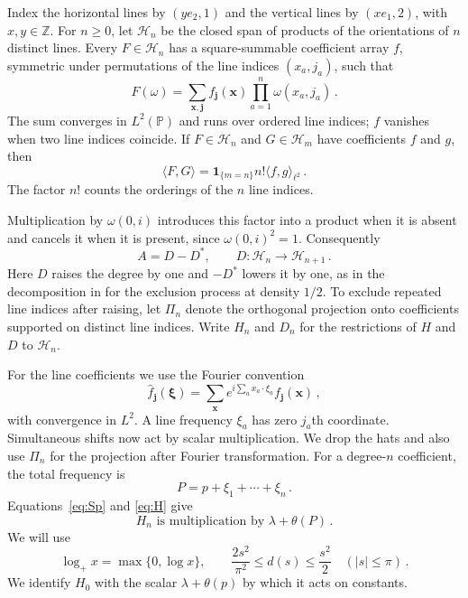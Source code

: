\documentclass[11pt]{amsart}
\theoremstyle{plain}
\theoremstyle{definition}
\newcommand{\Z}{\mathbb Z}
\renewcommand{\P}{\mathbb P}
\newcommand{\1}{\mathbf 1}
\newcommand{\ip}[2]{\langle #1,#2\rangle}
\newcommand{\abs}[1]{\lvert #1\rvert}
\newcommand{\Hs}{\mathcal H}
\begin{document}
	Index the horizontal lines by $(ye_2,1)$ and the vertical lines by
	$(xe_1,2)$, with $x,y\in\Z$.  For $n\geq0$, let $\Hs_n$ be the closed
	span of products of the orientations of $n$ distinct lines.
	Every $F\in\Hs_n$ has a square-summable coefficient array $f$, symmetric
	under permutations of the line indices $(x_a,j_a)$, such that
	\[
	F(\omega)=\sum_{\mathbf x,\mathbf j}f_{\mathbf j}(\mathbf x)
	\prod_{a=1}^n\omega(x_a,j_a)\, .
	\]
	The sum converges in $L^2(\P)$ and runs over ordered line indices;
	$f$ vanishes when two line indices coincide.
	If $F\in\Hs_n$ and
	$G\in\Hs_m$ have coefficients $f$ and $g$, then
	\begin{equation}\label{eq:iso}
		\ip FG=\1_{\{m=n\}}n!\ip fg_{\ell^2}\, .
	\end{equation}
	The factor $n!$ counts the orderings of the $n$ line indices.
	
	Multiplication by $\omega(0,i)$ introduces this factor into a product
	when it is absent and cancels it when it is present, since
	$\omega(0,i)^2=1$.  Consequently
	\begin{equation}\label{eq:DA}
		A=D-D^*,\qquad D\colon\Hs_n\longrightarrow\Hs_{n+1}\, .
	\end{equation}
	Here $D$ raises the degree by one and $-D^*$ lowers it by one, as in the
	decomposition in \citet*[(2.6)--(2.8)]{LQSY04} for the exclusion process
	at density $1/2$.
	To exclude repeated line indices after raising, let $\Pi_n$ denote the
	orthogonal projection onto coefficients supported on distinct line indices.
	Write $H_n$ and $D_n$ for the restrictions of $H$ and $D$ to $\Hs_n$.
	
	For the line coefficients we use the Fourier convention
	\begin{equation}\label{eq:line-fourier}
		\widehat f_{\mathbf j}(\boldsymbol\xi)
		=\sum_{\mathbf x}e^{i\sum_a x_a\cdot\xi_a}f_{\mathbf j}(\mathbf x)\, ,
	\end{equation}
	with convergence in $L^2$.  A line frequency $\xi_a$ has zero $j_a$th
	coordinate.  Simultaneous shifts now act by scalar multiplication.
	We drop the hats and also use $\Pi_n$ for the projection after Fourier
	transformation.
	For a degree-$n$ coefficient, the total frequency is
	\begin{equation}\label{eq:P}
		P=p+\xi_1+\cdots+\xi_n\, .
	\end{equation}
	Equations~\eqref{eq:Sp} and \eqref{eq:H} give
	\begin{equation}\label{eq:Hsym}
		\text{$H_n$ is multiplication by }\lambda+\theta(P)\, .
	\end{equation}
	We will use
	\begin{equation}\label{eq:sine}
		\log_+x=\max\{0,\log x\},
		\qquad \frac{2s^2}{\pi^2}\leq d(s)\leq\frac{s^2}{2}
		\quad (\abs s\leq\pi)\, .
	\end{equation}
	We identify $H_0$ with the scalar $\lambda+\theta(p)$ by which it acts
	on constants.
	
\end{document}
